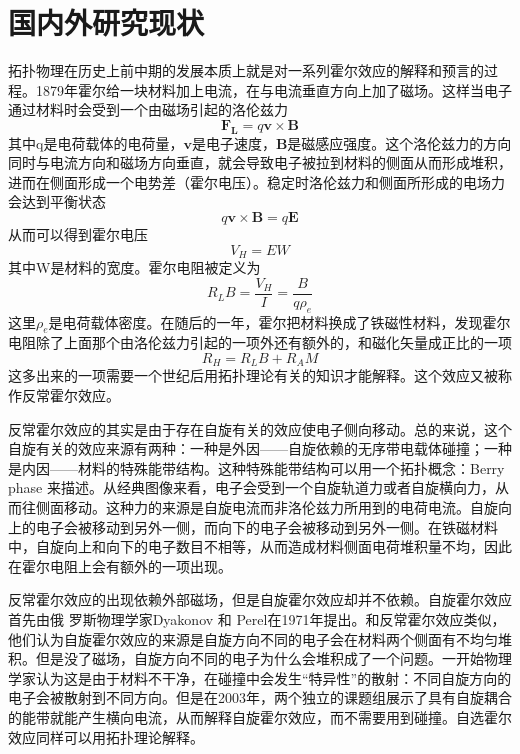\section{国内外研究现状}
拓扑物理在历史上前中期的发展本质上就是对一系列霍尔效应的解释和预言的过程。1879年霍尔给一块材料加上电流，在与电流垂直方向上加了磁场\cite{hallOrigin}。这样当电子通过材料时会受到一个由磁场引起的洛伦兹力
\begin{equation}
\mathbf{F_L} = q \mathbf{v} \times \mathbf{B}
\end{equation}
其中q是电荷载体的电荷量，$\mathbf{v}$是电子速度，$\mathbf{B}$是磁感应强度。这个洛伦兹力的方向同时与电流方向和磁场方向垂直，就会导致电子被拉到材料的侧面从而形成堆积，进而在侧面形成一个电势差（霍尔电压）。稳定时洛伦兹力和侧面所形成的电场力会达到平衡状态
\begin{equation}
 q \mathbf{v} \times \mathbf{B} = q \mathbf{E}
\end{equation}
从而可以得到霍尔电压
\begin{equation}
  V_H = EW
  \end{equation}
其中W是材料的宽度。霍尔电阻被定义为
\begin{equation}
  R_L B = \frac{V_H}{I} = \frac{B}{q\rho_e}
\end{equation}
这里$\rho_e$是电荷载体密度。在随后的一年，霍尔把材料换成了铁磁性材料，发现霍尔电阻除了上面那个由洛伦兹力引起的一项外还有额外的，和磁化矢量成正比的一项
\begin{equation}
R_H = R_L B + R_A M 
\end{equation}
这多出来的一项需要一个世纪后用拓扑理论有关的知识才能解释。这个效应又被称作反常霍尔效应。

反常霍尔效应的其实是由于存在自旋有关的效应使电子侧向移动。总的来说，这个自旋有关的效应来源有两种：一种是外因——自旋依赖的无序带电载体碰撞；一种是内因——材料的特殊能带结构。这种特殊能带结构可以用一个拓扑概念：Berry phase 来描述\cite{abnomalHall}。从经典图像来看，电子会受到一个自旋轨道力或者自旋横向力，从而往侧面移动。这种力的来源是自旋电流而非洛伦兹力所用到的电荷电流\cite{spinCurrent}。自旋向上的电子会被移动到另外一侧，而向下的电子会被移动到另外一侧。在铁磁材料中，自旋向上和向下的电子数目不相等，从而造成材料侧面电荷堆积量不均，因此在霍尔电阻上会有额外的一项出现。
  
反常霍尔效应的出现依赖外部磁场，但是自旋霍尔效应却并不依赖。自旋霍尔效应首先由俄
罗斯物理学家Dyakonov 和 Perel在1971年提出\cite{rassian, rassian2}。和反常霍尔效应类似，他们认为自旋霍尔效应的来源是自旋方向不同的电子会在材料两个侧面有不均匀堆积。但是没了磁场，自旋方向不同的电子为什么会堆积成了一个问题。一开始物理学家认为这是由于材料不干净，在碰撞中会发生“特异性”的散射：不同自旋方向的电子会被散射到不同方向\cite{scatterForHall}。但是在2003年，两个独立的课题组展示了具有自旋耦合的能带就能产生横向电流，从而解释自旋霍尔效应，而不需要用到碰撞\cite{indepenSpinHall}。自选霍尔效应同样可以用拓扑理论解释。
  
